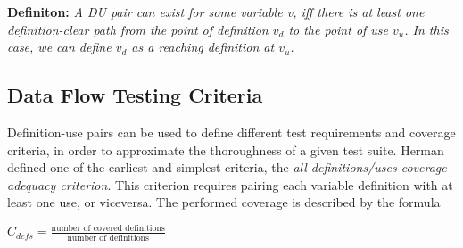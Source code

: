 \begin{center}
\begin{minipage}{0.9\textwidth}
\textbf{Definiton: }\textit{A DU pair can exist for some variable \textit{v}, iff there is at least one 
definition-clear path from the point of definition $v_d$ to the point of use $v_u$. In this case, we can
define $v_d$ as a \textit{reaching definition} at $v_u$.}  
\end{minipage}
\end{center}
%
%

\subsection{Data Flow Testing Criteria}\label{criteria}

Definition-use pairs can be used to define different test requirements and coverage criteria, in order to approximate the thoroughness of a given test suite.
Herman \cite{Herman} defined one of the earliest and simplest criteria, the \textit{all definitions/uses coverage adequacy criterion}. This criterion requires pairing each variable definition with at least one use, or viceversa. The performed coverage is described by the formula 

\begin{center}
  $C_{defs} = \frac{\text{number of covered definitions}}
  {\text{number of definitions}}$
\end{center}


